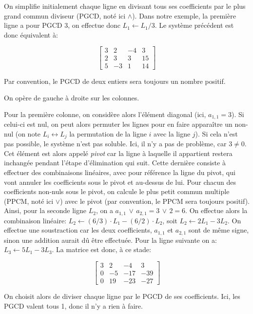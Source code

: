 \documentclass[11pt,a4paper]{article}
\begin{document}
On simplifie initialement chaque ligne en divisant tous ses
coefficients par le plus grand commun diviseur (PGCD, noté ici
$\wedge$). Dans notre exemple, la première ligne a pour PGCD 3, on
effectue donc $L_1 \leftarrow L_1/3$. Le système précédent est donc
équivalent à:

\[
\left[
\begin{array}{rrr|r}
3 &  2 & -4 &  3\\
2 &  3 &  3 & 15\\
5 & -3 &  1 & 14
\end{array}
\right]
\]

Par convention, le PGCD de deux entiers sera toujours un nombre
positif.

On opère de gauche à droite sur les colonnes.

Pour la première colonne, on considère alors l'élément diagonal (ici,
$a_{1,1} = 3$). Si celui-ci est nul, on peut alors permuter les lignes
pour en faire apparaître un non-nul (on note $L_i \leftrightarrow L_j$
la permutation de la ligne $i$ avec la ligne $j$). Si cela n'est pas
possible, le système n'est pas soluble. Ici, il n'y a pas de problème,
car $3 \neq 0$. Cet élément est alors appelé \emph{pivot} car la ligne
à laquelle il appartient restera inchangée pendant l'étape
d'élimination qui suit. Cette dernière consiste à effectuer des
combinaisons linéaires, avec pour référence la ligne du pivot, qui
vont annuler les coefficients sous le pivot et au-dessus de lui. Pour
chacun des coefficients non-nuls sous le pivot, on calcule le plus
petit commun multiple (PPCM, noté ici $\vee$) avec le pivot (par
convention, le PPCM sera toujours positif). Ainsi, pour la seconde
ligne $L_2$, on a $a_{1,1} \, \vee \, a_{2,1} = 3 \, \vee \, 2 =
6$. On effectue alors la combinaison linéaire: $L_2 \leftarrow (6/3)
\cdot L_1 - (6/2) \cdot L_2$, soit $L_2 \leftarrow 2 L_1 - 3 L_2$. On
effectue une soustraction car les deux coefficients, $a_{1,1}$ et
$a_{2,1}$ sont de même signe, sinon une addition aurait dû être
effectuée. Pour la ligne suivante on a: $L_3 \leftarrow 5 L_1 - 3
L_3$. La matrice est donc, à ce stade:

\[
\left[
\begin{array}{rrr|r}
3 &  2 &  -4 &   3\\
0 & -5 & -17 & -39\\
0 & 19 & -23 & -27
\end{array}
\right]
\]

On choisit alors de diviser chaque ligne par le PGCD de ses
coefficients. Ici, les PGCD valent tous 1, donc il n'y a rien à faire.
\end{document}
